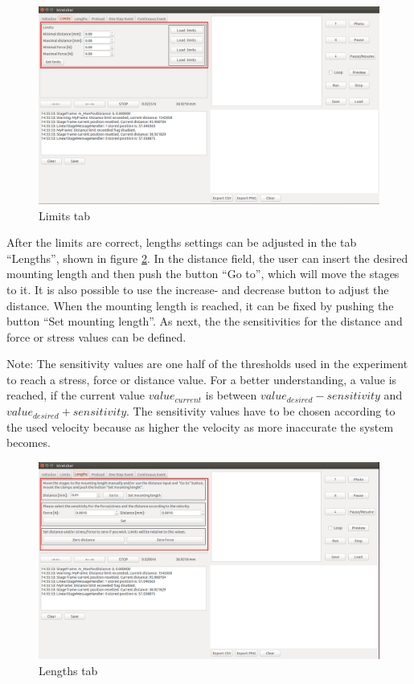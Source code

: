 \begin{figure}[!ht]
	\centering
		\includegraphics[width=1.0\textwidth]{images/Limits}
	\caption{Limits tab}
	\label{fig:limits}
\end{figure}

After the limits are correct, lengths settings can be adjusted in the tab ``Lengths'', shown in figure \ref{fig:lengths}. In the distance field, the user can insert the desired mounting length and then push the button ``Go to'', which will move the stages to it. It is also possible to use the increase- and decrease button to adjust the distance. When the mounting length is reached, it can be fixed by pushing the button ``Set mounting length''. As next, the the sensitivities for the distance and force or stress values can be defined.


\begin{narrowframed}
	Note: The sensitivity values are one half of the thresholds used in the experiment to reach a stress, force or distance value. For a better understanding, a value is reached, if the current value \(value_{current}\) is between \(value_{desired} - sensitivity\) and \(value_{desired} + sensitivity\). The sensitivity values have to be chosen according to the used velocity because as higher the velocity as more inaccurate the system becomes.
\end{narrowframed}

\begin{figure}[!ht]
	\centering
		\includegraphics[width=1.0\textwidth]{images/Lengths}
	\caption{Lengths tab}
	\label{fig:lengths}
\end{figure}

